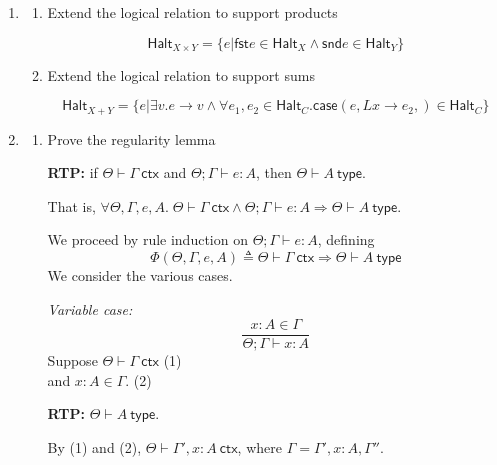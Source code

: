 \documentclass[10pt,\jkfside,a4paper]{article}
\newcommand{\answer}[1]{
    \begin{tcolorbox}[colframe=black, colback=white, sharp corners, boxrule=0.2mm, breakable]
        #1
    \end{tcolorbox}
}
\begin{document}

\begin{enumerate} 
    \item
    \begin{enumerate} 
        \item
        Extend the logical relation to support products

        \answer{ 
            \[ 
                \mathsf{Halt}_{X \times Y} = \{ e | \mathsf{fst} e \in \mathsf{Halt}_X \wedge \mathsf{snd} e \in \mathsf{Halt}_Y \}
            \]
        }

        \item
        Extend the logical relation to support sums 

        \answer{ 
            \[ 
                \mathsf{Halt}_{X + Y} = \{ e | \exists v. e \to v \wedge \forall e_1, e_2 \in \mathsf{Halt}_C. \mathsf{case}(e, L x \to e_2, )\in \mathsf{Halt}_C \}
            \]
        }

    \end{enumerate}

    \item
    \begin{enumerate} 
        \item
        Prove the regularity lemma

        \answer{
            \textbf{RTP:} if $\Theta \vdash \Gamma\ \mathsf{ctx}$ and $\Theta ; \Gamma \vdash e : A$, then $\Theta \vdash A\ \mathsf{type}$.

            That is, $\forall \Theta, \Gamma, e, A.\; \Theta \vdash \Gamma\ \mathsf{ctx} \wedge \Theta ; \Gamma \vdash e : A \Rightarrow \Theta \vdash A\ \mathsf{type}$.

            We proceed by rule induction on $\Theta ; \Gamma \vdash e : A$, defining
            \[
                \Phi(\Theta, \Gamma, e, A) \triangleq \Theta \vdash \Gamma\ \mathsf{ctx} \Rightarrow \Theta \vdash A\ \mathsf{type}
            \]
            We consider the various cases.

            \textit{Variable case:}
            \[
                \frac{x : A \in \Gamma}{\Theta ; \Gamma \vdash x : A}
            \]
            Suppose $\Theta \vdash \Gamma\ \mathsf{ctx}$ \hfill (1) \\
            and $x : A \in \Gamma$. \hfill (2)

            \textbf{RTP:} $\Theta \vdash A\ \mathsf{type}$.

            By (1) and (2), $\Theta \vdash \Gamma', x : A\ \mathsf{ctx}$, where $\Gamma = \Gamma', x : A, \Gamma''$.

}
\end{enumerate}
\end{enumerate}
\end{document}

